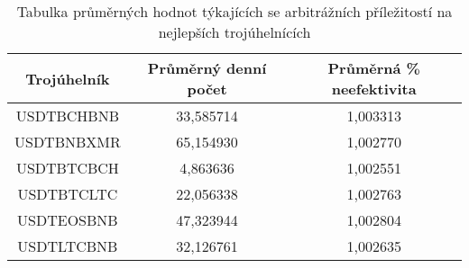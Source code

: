 \begin{table}\centering
\caption{Tabulka průměrných hodnot týkajících se arbitrážních příležitostí na nejlepších trojúhelnících}
\label{table_averages_best}
\begin{tabular}{|| c | c | c ||}\hline Trojúhelník & Průměrný denní počet & Průměrná \% neefektivita\\ [0.5ex]
 \hline\hline USDTBCHBNB & 33,585714 & 1,003313\\ 
 \hline USDTBNBXMR & 65,154930 & 1,002770\\ 
 \hline USDTBTCBCH & 4,863636 & 1,002551\\ 
 \hline USDTBTCLTC & 22,056338 & 1,002763\\ 
 \hline USDTEOSBNB & 47,323944 & 1,002804\\ 
 \hline USDTLTCBNB & 32,126761 & 1,002635\\ 
 \hline
\end{tabular}
\end{table}